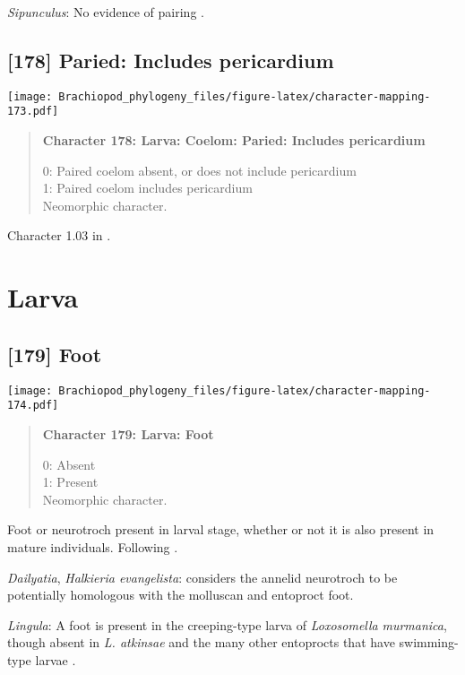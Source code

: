 \documentclass[openany]{book}
\theoremstyle{definition}
\theoremstyle{definition}
\theoremstyle{definition}
\theoremstyle{remark}
\begin{document}
\hypertarget{Sipunculus-coding-177}{}
\emph{Sipunculus}: No evidence of pairing \citep{Reed1982}.

\subsection*{{[}178{]} Paried: Includes
pericardium}\label{paried-includes-pericardium}

\texttt{[image: Brachiopod\_phylogeny\_files/figure-latex/character-mapping-173.pdf]}

\begin{quote}
\textbf{Character 178: Larva: Coelom: Paried: Includes pericardium}

0: Paired coelom absent, or does not include pericardium\\
1: Paired coelom includes pericardium\\
Neomorphic character.
\end{quote}

Character 1.03 in \citet{Scheltema1993}.

\section{Larva}\label{larva-1}

\subsection*{{[}179{]} Foot}\label{foot-1}

\texttt{[image: Brachiopod\_phylogeny\_files/figure-latex/character-mapping-174.pdf]}

\begin{quote}
\textbf{Character 179: Larva: Foot}

0: Absent\\
1: Present\\
Neomorphic character.
\end{quote}

Foot or neurotroch present in larval stage, whether or not it is also
present in mature individuals. Following \citet{Wingstrand1985}.

\hypertarget{Dailyatia-coding-179}{}
\emph{Dailyatia}, \emph{Halkieria evangelista}: \citet{Wingstrand1985}
considers the annelid neurotroch to be potentially homologous with the
molluscan and entoproct foot.

\hypertarget{Lingula-coding-179}{}
\emph{Lingula}: A foot is present in the creeping-type larva of
\emph{Loxosomella} \emph{murmanica}, though absent in \emph{L. atkinsae}
and the many other entoprocts that have swimming-type larvae
\citep{Fuchs2008}.
\end{document}

